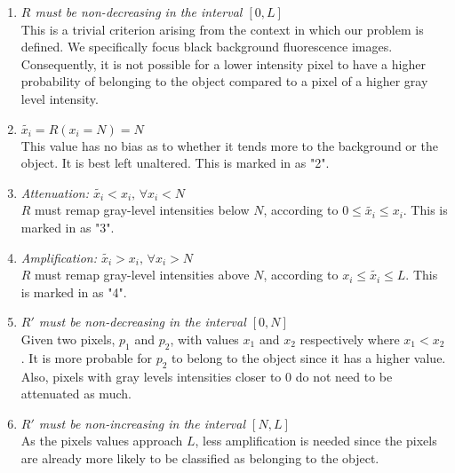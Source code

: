 \begin{enumerate}
	\item{}
	\textit{$R$ must be non-decreasing in the interval $[0, L]$}\\
	This is a trivial criterion arising from the context in which our problem is defined. We specifically focus black background fluorescence images. Consequently, it is not possible for a lower intensity pixel to have a higher probability of belonging to the object compared to a pixel of a higher gray level intensity. 
	
	\item
	\textit{$\widetilde{x_i} = R(x_i=N) = N$}\\
	This value has no bias as to whether it tends more to the background or the object. It is best left unaltered. This is marked in  as "2".
	
	\item
	\textit{Attenuation: $\widetilde{x_i} < x_i, \, \forall x_i<N$}\\
	$R$ must remap gray-level intensities below $N$, according to $0 \leq \widetilde{x_i} \leq x_i$. This is marked in  as "3".
	
	\item
	\textit{Amplification: $\widetilde{x_i} > x_i, \, \forall x_i>N$}\\
	$R$ must remap gray-level intensities above $N$, according to $x_i \leq \widetilde{x_i} \leq L$. This is marked in  as "4".
	
	\item
	\textit{$R'$ must be non-decreasing in the interval $[0,N]$}\\
	Given two pixels, $p_1$ and $p_2$, with values $x_1$ and $x_2$ respectively where $x_1<x_2$. It is more probable for $p_2$ to belong to the object since it has a higher value. Also, pixels with gray levels intensities closer to $0$ do not need to be attenuated as much.
	
	\item
	\textit{$R'$ must be non-increasing in the interval $[N,L]$}\\
	As the pixels values approach $L$, less amplification is needed since the pixels are already more likely to be classified as belonging to the object.
\end{enumerate}



